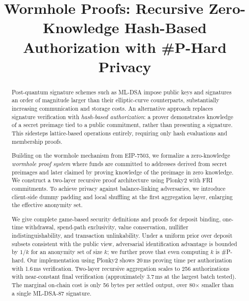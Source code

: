 \documentclass{iacrcc}
\title[running={Wormhole Proofs}]{Wormhole Proofs: Recursive Zero-Knowledge Hash-Based Authorization with \#P-Hard Privacy}
\begin{document}
\maketitle


\begin{abstract}
Post-quantum signature schemes such as ML-DSA impose public keys and signatures an order of magnitude larger than their elliptic-curve counterparts, substantially increasing communication and storage costs. An alternative approach replaces signature verification with \emph{hash-based authorization}: a prover demonstrates knowledge of a secret preimage tied to a public commitment, rather than presenting a signature. This sidesteps lattice-based operations entirely, requiring only hash evaluations and membership proofs.

Building on the wormhole mechanism from EIP-7503, we formalize a zero-knowledge \emph{wormhole proof system} where funds are committed to addresses derived from secret preimages and later claimed by proving knowledge of the preimage in zero knowledge. We construct a two-layer recursive proof architecture using Plonky2 with FRI commitments. To achieve privacy against balance-linking adversaries, we introduce client-side dummy padding and local shuffling at the first aggregation layer, enlarging the effective anonymity set.

We give complete game-based security definitions and proofs for deposit binding, one-time withdrawal, spend-path exclusivity, value conservation, nullifier indistinguishability, and transaction unlinkability. Under a uniform prior over deposit subsets consistent with the public view, adversarial identification advantage is bounded by \(1/k\) for an anonymity set of size \(k\); we further prove that even computing \(k\) is \#P-hard. Our implementation using Plonky2 shows 20\,ms proving time per authorization with 1.6\,ms verification. Two-layer recursive aggregation scales to 256 authorizations with near-constant final verification (approximately 3.7\,ms at the largest batch tested). The marginal on-chain cost is only 56 bytes per settled output, over 80$\times$ smaller than a single ML-DSA-87 signature.
\end{abstract}
\end{document}
